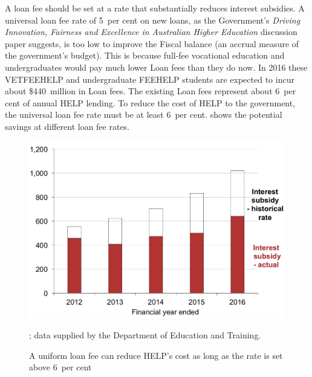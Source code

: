 \documentclass[embargoed]{grattan}
\begin{document}
A loan fee should be set at a rate that substantially reduces interest subsidies.
A universal loan fee rate of 5~per cent on new loans, as the Government's \emph{Driving Innovation, Fairness and Excellence in Australian Higher Education} discussion paper suggests, is too low to improve the \gls{Fiscal balance} (an accrual measure of the government's budget).
This is because full-fee vocational education and undergraduates would pay much lower \gls{Loan fees} than they do now.
In 2016 these \gls{VETFEEHELP} and undergraduate \gls{FEEHELP} students are expected to incur about \$440~million in \gls{Loan fees}.
The existing \gls{Loan fees} represent about 6~per cent of annual \gls{HELP} lending.
To reduce the cost of \gls{HELP} to the government, the universal loan fee rate must be at least 6~per cent.
 shows the potential savings at different loan fee rates.

\begin{figure}
\caption[A uniform loan fee can reduce {HELP}'s cost as long as the rate is set above 6~per cent]{A uniform loan fee can reduce \gls{HELP}'s cost as long as the rate is set above 6~per cent}\label{fig:fig20-uniform-loan-fee-can-reduce-HELPs-cost-as-long-as-the-rate-is-set-above-6pc}

\includegraphics[page=20]{atlas/Chartpack.pdf}

%
{\textcites[][Table~57]{Education2015Highereducationreport}[][15]{Ryan2016RedesigningVETFEE}{Birmingham2016MediareleaseNew}; data supplied by the Department of Education and Training.}
\end{figure}
\end{document}
